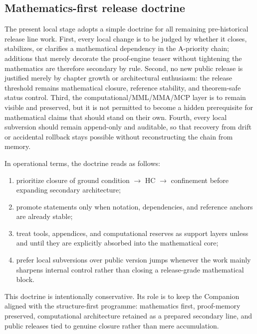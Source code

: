 \documentclass[12pt,a4paper]{article}
\DeclareRobustCommand{\QSCver}[1]{archival stage}
\renewcommand{\QSCver}[1]{historical release line}
\begin{document}
\subsection*{Mathematics-first release doctrine}
The present local stage adopts a simple doctrine for all remaining pre-\QSCver{v2.27.0} work. First, every local change is to be judged by whether it closes, stabilizes, or clarifies a mathematical dependency in the A-priority chain; additions that merely decorate the proof-engine teaser without tightening the mathematics are therefore secondary by rule. Second, no new public release is justified merely by chapter growth or architectural enthusiasm: the release threshold remains mathematical closure, reference stability, and theorem-safe status control. Third, the computational/MML/MMA/MCP layer is to remain visible and preserved, but it is not permitted to become a hidden prerequisite for mathematical claims that should stand on their own. Fourth, every local subversion should remain append-only and auditable, so that recovery from drift or accidental rollback stays possible without reconstructing the chain from memory.

In operational terms, the doctrine reads as follows:
\begin{enumerate}[label=(\roman*)]
 \item prioritize closure of ground condition $\rightarrow$ HC $\rightarrow$ confinement before expanding secondary architecture;
 \item promote statements only when notation, dependencies, and reference anchors are already stable;
 \item treat tools, appendices, and computational reserves as support layers unless and until they are explicitly absorbed into the mathematical core;
 \item prefer local subversions over public version jumps whenever the work mainly sharpens internal control rather than closing a release-grade mathematical block.
\end{enumerate}

This doctrine is intentionally conservative. Its role is to keep the Companion aligned with the structure-first programme: mathematics first, proof-memory preserved, computational architecture retained as a prepared secondary line, and public releases tied to genuine closure rather than mere accumulation.
\end{document}
